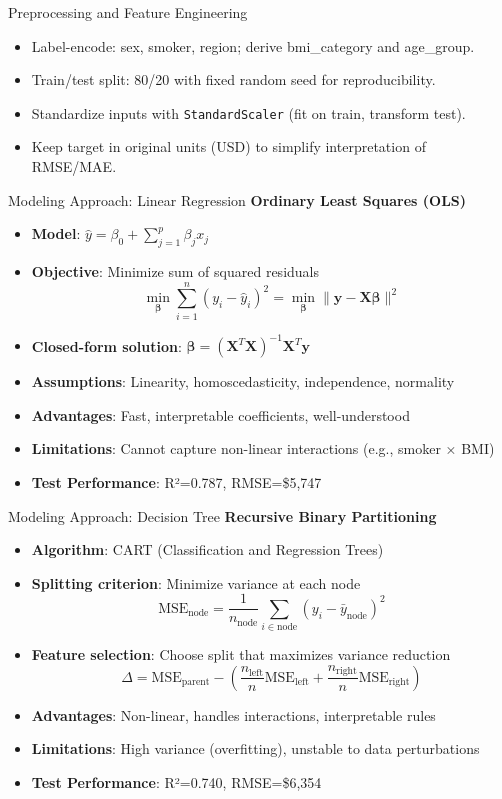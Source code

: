 \documentclass[10pt]{beamer}
\begin{document}
\begin{frame}{Preprocessing and Feature Engineering}
\begin{itemize}
  \item Label-encode: sex, smoker, region; derive bmi\_category and age\_group.
  \item Train/test split: 80/20 with fixed random seed for reproducibility.
  \item Standardize inputs with \texttt{StandardScaler} (fit on train, transform test).
  \item Keep target in original units (USD) to simplify interpretation of RMSE/MAE.
\end{itemize}
\end{frame}

\begin{frame}{Modeling Approach: Linear Regression}
\textbf{Ordinary Least Squares (OLS)}
\begin{itemize}
\item \textbf{Model}: $\hat{y} = \beta_0 + \sum_{j=1}^{p} \beta_j x_j$
\item \textbf{Objective}: Minimize sum of squared residuals
  $$\min_{\boldsymbol{\beta}} \sum_{i=1}^{n} (y_i - \hat{y}_i)^2 = \min_{\boldsymbol{\beta}} \|\mathbf{y} - \mathbf{X}\boldsymbol{\beta}\|^2$$
\item \textbf{Closed-form solution}: $\hat{\boldsymbol{\beta}} = (\mathbf{X}^T\mathbf{X})^{-1}\mathbf{X}^T\mathbf{y}$
\item \textbf{Assumptions}: Linearity, homoscedasticity, independence, normality
\item \textbf{Advantages}: Fast, interpretable coefficients, well-understood
\item \textbf{Limitations}: Cannot capture non-linear interactions (e.g., smoker × BMI)
\item \textbf{Test Performance}: R²=0.787, RMSE=\$5,747
\end{itemize}
\end{frame}

\begin{frame}{Modeling Approach: Decision Tree}
\textbf{Recursive Binary Partitioning}
\begin{itemize}
\item \textbf{Algorithm}: CART (Classification and Regression Trees)
\item \textbf{Splitting criterion}: Minimize variance at each node
  $$\text{MSE}_{\text{node}} = \frac{1}{n_{\text{node}}} \sum_{i \in \text{node}} (y_i - \bar{y}_{\text{node}})^2$$
\item \textbf{Feature selection}: Choose split that maximizes variance reduction
  $$\Delta = \text{MSE}_{\text{parent}} - \left(\frac{n_{\text{left}}}{n} \text{MSE}_{\text{left}} + \frac{n_{\text{right}}}{n} \text{MSE}_{\text{right}}\right)$$
\item \textbf{Advantages}: Non-linear, handles interactions, interpretable rules
\item \textbf{Limitations}: High variance (overfitting), unstable to data perturbations
\item \textbf{Test Performance}: R²=0.740, RMSE=\$6,354
\end{itemize}
\end{frame}
\end{document}

